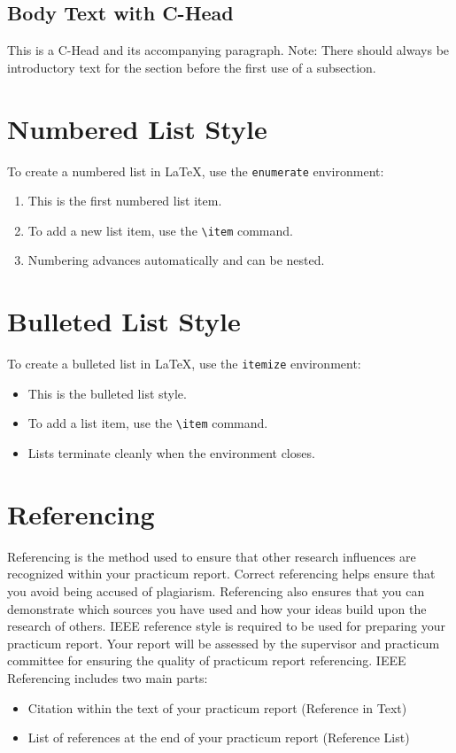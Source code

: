 \subsection{Body Text with C-Head}
\label{sec:c-head-body}

This is a C-Head and its accompanying paragraph. Note: There should always be introductory text for the section before the first use of a subsection.

\section{Numbered List Style}
\label{sec:numbered-list}

To create a numbered list in LaTeX, use the \texttt{enumerate} environment:
\begin{enumerate}
  \item This is the first numbered list item.
  \item To add a new list item, use the \texttt{\textbackslash item} command.
  \item Numbering advances automatically and can be nested.
\end{enumerate}

\section{Bulleted List Style}
\label{sec:bulleted-list}

To create a bulleted list in LaTeX, use the \texttt{itemize} environment:
\begin{itemize}
  \item This is the bulleted list style.
  \item To add a list item, use the \texttt{\textbackslash item} command.
  \item Lists terminate cleanly when the environment closes.
\end{itemize}

\section{Referencing}
\label{sec:referencing}

Referencing is the method used to ensure that other research influences are recognized within your practicum report. Correct referencing helps ensure that you avoid being accused of plagiarism. Referencing also ensures that you can demonstrate which sources you have used and how your ideas build upon the research of others. IEEE reference style is required to be used for preparing your practicum report. Your report will be assessed by the supervisor and practicum committee for ensuring the quality of practicum report referencing. IEEE Referencing includes two main parts:
\begin{itemize}
  \item Citation within the text of your practicum report (Reference in Text)
  \item List of references at the end of your practicum report (Reference List)
\end{itemize}


